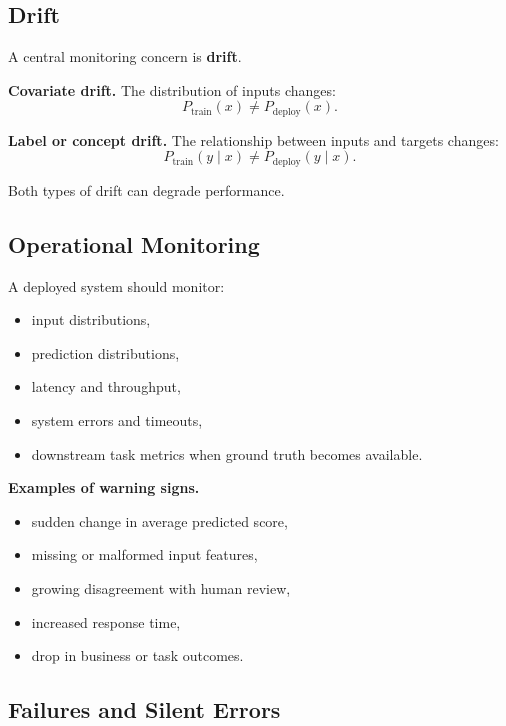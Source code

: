 \subsection{Drift}

A central monitoring concern is \textbf{drift}.

\medskip

\noindent
\textbf{Covariate drift.}
The distribution of inputs changes:
\[
P_{\mathrm{train}}(x) \neq P_{\mathrm{deploy}}(x).
\]

\medskip

\noindent
\textbf{Label or concept drift.}
The relationship between inputs and targets changes:
\[
P_{\mathrm{train}}(y \mid x) \neq P_{\mathrm{deploy}}(y \mid x).
\]

\medskip

\noindent
Both types of drift can degrade performance.

\subsection{Operational Monitoring}

A deployed system should monitor:
\begin{itemize}
    \item input distributions,
    \item prediction distributions,
    \item latency and throughput,
    \item system errors and timeouts,
    \item downstream task metrics when ground truth becomes available.
\end{itemize}

\medskip

\noindent
\textbf{Examples of warning signs.}
\begin{itemize}
    \item sudden change in average predicted score,
    \item missing or malformed input features,
    \item growing disagreement with human review,
    \item increased response time,
    \item drop in business or task outcomes.
\end{itemize}

\subsection{Failures and Silent Errors}

